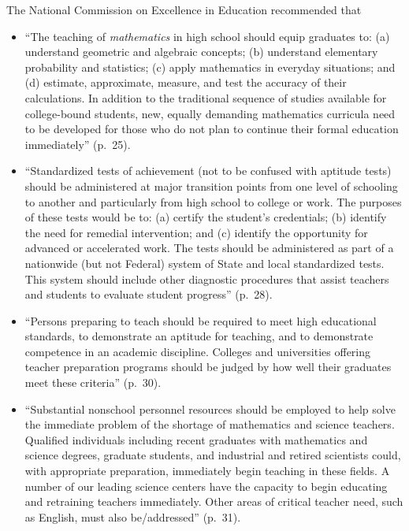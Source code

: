 \documentclass[
]{book}
\theoremstyle{definition}
\theoremstyle{definition}
\theoremstyle{definition}
\theoremstyle{definition}
\theoremstyle{remark}
\begin{document}
The National Commission on Excellence in Education \citeyearpar{NCEE1983} recommended that

\begin{itemize}
\item
  ``The teaching of \emph{mathematics} in high school should equip graduates to: (a) understand geometric and algebraic concepts; (b) understand elementary probability and statistics; (c) apply mathematics in everyday situations; and (d) estimate, approximate, measure, and test the accuracy of their calculations. In addition to the traditional sequence of studies available for college-bound students, new, equally demanding mathematics curricula need to be developed for those who do not plan to continue their formal education immediately'' (p.~25).
\item
  ``Standardized tests of achievement (not to be confused with aptitude tests) should be administered at major transition points from one level of schooling to another and particularly from high school to college or work. The purposes of these tests would be to: (a) certify the student's credentials; (b) identify the need for remedial intervention; and (c) identify the opportunity for advanced or accelerated work. The tests should be administered as part of a nationwide (but not Federal) system of State and local standardized tests. This system should include other diagnostic procedures that assist teachers and students to evaluate student progress'' (p.~28).
\item
  ``Persons preparing to teach should be required to meet high educational standards, to demonstrate an aptitude for teaching, and to demonstrate competence in an academic discipline. Colleges and universities offering teacher preparation programs should be judged by how well their graduates meet these criteria'' (p.~30).
\item
  ``Substantial nonschool personnel resources should be employed to help solve the immediate problem of the shortage of mathematics and science teachers. Qualified individuals including recent graduates with mathematics and science degrees, graduate students, and industrial and retired scientists could, with appropriate preparation, immediately begin teaching in these fields. A number of our leading science centers have the capacity to begin educating and retraining teachers immediately. Other areas of critical teacher need, such as English, must also be/addressed'' (p.~31).
\end{itemize}
\end{document}
